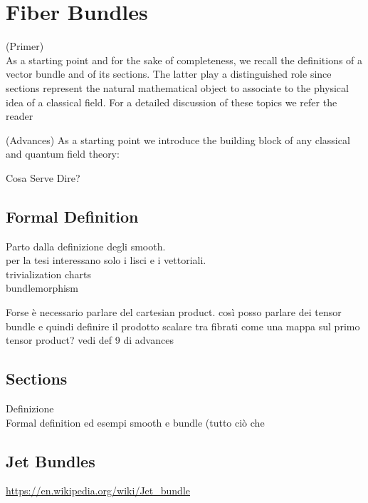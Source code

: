 \documentclass[Main]{subfiles}
\begin{document}
	\section{Fiber Bundles}
	\begin{Warning}
	(Primer)\\
	As a starting point and for the sake of completeness, we recall the definitions of a vector bundle and of
its sections. The latter play a distinguished role since sections represent the natural mathematical object to associate to the physical idea of a classical field. For a detailed discussion of these topics we refer the reader
	\end{Warning}
	\begin{Warning}
	(Advances)
	As a starting point we introduce the building block of any classical and quantum field theory:
	\end{Warning}
	
	
	
		Cosa Serve Dire?
			\subsection{Formal Definition}
			Parto dalla definizione degli smooth.\\
			per la tesi interessano solo i lisci e i vettoriali.\\
			trivialization charts\\
			bundlemorphism\\
			\begin{Warning}
				Forse è necessario parlare del cartesian product. così posso parlare dei tensor bundle e quindi definire il prodotto scalare tra fibrati come una mappa sul primo tensor product?
				vedi def 9 di advances
				
			\end{Warning}			
			
			\subsection{Sections}
			Definizione\\
			
Formal definition ed esempi smooth e bundle (tutto ciò che 

			\subsection{Jet Bundles}
				\url{https://en.wikipedia.org/wiki/Jet_bundle}
				
\end{document}
